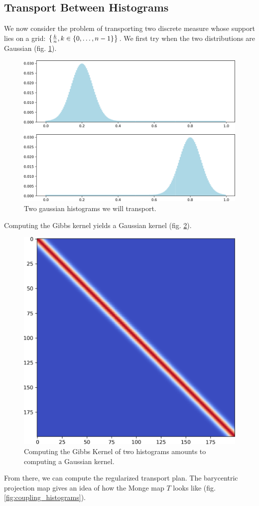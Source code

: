 \FloatBarrier
\subsection{Transport Between Histograms}

We now consider the problem of transporting two discrete measure whose support lies on a grid: $\left\{ \frac{k}{n}, k \in \left\{ 0, \dots, n-1 \right\} \right\}$. We first try when the two distributions are Gaussian (fig. \ref{fig:two_histograms}).

\begin{figure}[p]
    \centering
    \includegraphics[width=.7\textwidth]{samples/2/two_histograms.png}
    \caption{Two gaussian histograms we will transport.}
    \label{fig:two_histograms}
\end{figure}

Computing the Gibbs kernel yields a Gaussian kernel (fig. \ref{fig:gibbs_kernel}).

\begin{figure}[p]
    \centering
    \includegraphics[width=.5\textwidth]{samples/2/gibbs_kernel.png}
    \caption{Computing the Gibbs Kernel of two histograms amounts to computing a Gaussian kernel.}
    \label{fig:gibbs_kernel}
\end{figure}

From there, we can compute the regularized transport plan. The barycentric projection map gives an idea of how the Monge map $T$ looks like (fig. \ref{fig:coupling_histograms}).

